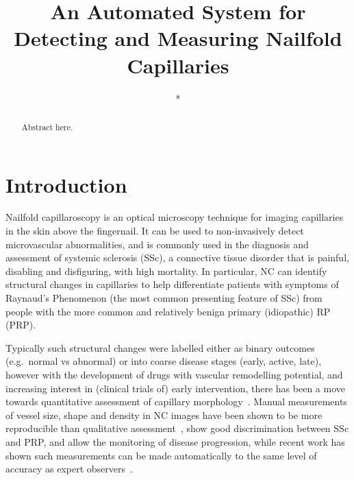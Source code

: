 \documentclass[runningheads,a4paper]{llncs}
\def\eg{e.g.}
\begin{document}
\mainmatter  %

\title{An Automated System for Detecting and Measuring Nailfold Capillaries}


%
%
\author{*}%

\institute{*}
\authorrunning{*} %

\tocauthor{}
\maketitle


\begin{abstract}
Abstract here.
\end{abstract}

\section{Introduction}
\label{s:introduction}
Nailfold capillaroscopy is an optical microscopy technique for imaging capillaries in the skin above the fingernail. It can be used to non-invasively detect microvascular abnormalities, and is commonly used in the diagnosis and assessment of systemic sclerosis (SSc), a connective tissue disorder that is painful, disabling and disfiguring, with high mortality. In particular, NC can identify structural changes in capillaries to help differentiate patients with symptoms of Raynaud’s Phenomenon (the most common presenting feature of SSc) from people with the more common and relatively benign primary (idiopathic) RP (PRP).

Typically such structural changes were labelled either as binary outcomes (\eg~normal vs abnormal) or into coarse disease stages (early, active, late), however with the development of drugs with vascular remodelling potential, and increasing interest in (clinical trials of) early intervention, there has been a move towards quantitative assessment of capillary morphology~\cite{Murray_etal_AR09,Paradowski_etal_KES09b,Berks_MICCAI14}. Manual measurements of vessel size, shape and density in NC images have been shown to be more reproducible than qualitative assessment~\cite{Murray_etal_AR09}, show good discrimination between SSc and PRP, and allow the monitoring of disease progression, while recent work has shown such measurements can be made automatically to the same level of accuracy as expert observers~\cite{Berks_MICCAI14}.
\end{document}
